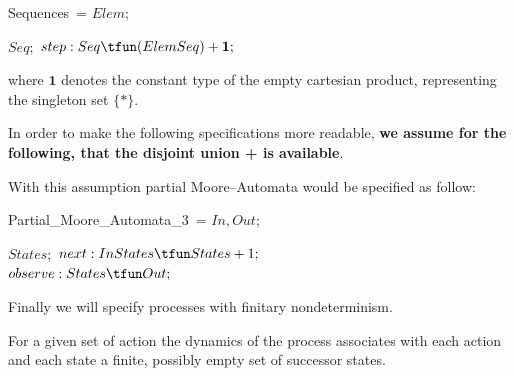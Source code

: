 \documentclass[landscape, autoslides, light]{mmiss}
\newcommand{\ns}{\normalsize}
\newcommand{\vsp}{\pause\vspace{8mm}}
\begin{document}
\begin{Package}[Label={FSDPT}, Title={Formal Specification of Data and Process Types}, ShortTitle={FSDPT}, Authors={Horst Reichel}, Date={February 2003}, LevelOfDetail=Lecture, Language=en-GB]
\begin{Section}[Title={Final Coalgebras as Process Types}, Label={section4}]
\begin{Section}[Title={Examples of Process Types}, Label={section4_2}]
\begin{Paragraph}[Title={Observable Termination}, Label=Paragraph110]
\end{Paragraph}
\begin{Paragraph}[Title={Observable Termination}, Label=Paragraph111]
\small
\begin{SpecDefn}{Sequences}~=
\I\Sort \( Elem; \) \item[\Then] \item[\Cofree~\Group]
\begin{Items}
\I\Sort \( Seq; \) \I\Ops \( step : Seq \tfun (Elem \* Seq)
+\mathbf{1};\)
 ~\EndGroup \end{Items}  \item[\End]
\end{SpecDefn}
where $\mathbf{1}$ denotes the constant type of the empty
cartesian product, representing the singleton set $\{*\}$.

In order to make the following specifications more readable,
\textbf{we assume for the following, that the disjoint union + is
available}.

\end{Paragraph}
\begin{Paragraph}[Title={Observable Termination}, Label=Paragraph112]
\ns
With this assumption partial Moore--Automata would be
specified as follow:
\begin{SpecDefn}{Partial\_Moore\_Automata\_3}~=
\I\Sort \( In, Out; \) \item[\Then] \item[\Cofree~\Group]
\begin{Items}
\I\Sort \( States; \) \I\Ops \( next : In \* States \tfun States +
1;\) \\ \(observe : States \tfun Out; \)
 ~\EndGroup \end{Items}  \item[\End]
\end{SpecDefn}


\end{Paragraph}
\begin{Paragraph}[Title={Nondeterminsm}, Label=Paragraph113]

Finally we will specify processes with finitary
nondeterminism.\vsp

For a given set of action the dynamics of the process associates
with each action and each state a finite, possibly empty set of
successor states.


\end{Paragraph}
\end{Section}
\end{Section}
\end{Package}
\end{document}
